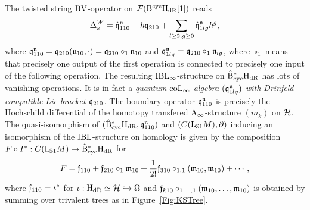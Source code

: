 \documentclass[\MainFolder/Text.tex]{subfiles}
\begin{document}
The twisted string $\mathrm{BV}$-operator on $\mathcal{F}(\mathrm{B}^{\mathrm{cyc}}\mathrm{H}_{\mathrm{dR}}[1])$ reads
\[ \operatorname{\Delta}^W_s = \hat{\mathfrak{q}}^{\mathfrak{n}}_{110}  +  \hbar{\mathfrak{q}}_{210} + \sum_{l\ge 2, g\ge 0} \hat{\mathfrak{q}}^{\mathfrak{n}}_{1lg} \hbar^{g}, \]
where $\mathfrak{q}_{110}^{\mathfrak{n}} = \mathfrak{q}_{210}(\mathfrak{n}_{10},\cdot) = \mathfrak{q}_{210} \circ_1 \mathfrak{n}_{10}$ and $\mathfrak{q}_{1lg}^{\mathfrak{n}} = \mathfrak{q}_{210}\circ_1 \mathfrak{n}_{lg}$, where $\circ_1$ means that precisely one output of the first operation is connected to precisely one input of the following operation.
The resulting $\mathrm{IBL}_\infty$-structure on $\hat{\mathrm{B}}_{\mathrm{cyc}}^*\mathrm{H}_{\mathrm{dR}}$ has lots of vanishing operations.
It is in fact a \emph{quantum $\mathrm{coL}_\infty$-algebra $(\mathfrak{q}_{1lg}^{\mathfrak{n}})$ with Drinfeld-compatible Lie bracket $\mathfrak{q}_{210}$.}
The boundary operator $\mathfrak{q}_{110}^{\mathfrak{n}}$ is precisely the Hochschild differential of the homotopy transfered $\mathrm{A}_\infty$-structure $(m_k)$ on $\mathcal{H}$.
The quasi-isomorphism of $(\hat{\mathrm{B}}_{\mathrm{cyc}}^*\mathrm{H}_{\mathrm{dR}},\mathfrak{q}_{110}^{\mathfrak{n}})$ and $(C(\mathrm{L}_{\mathbb{S}{1}} M),\partial)$ inducing an isomorphism of the $\mathrm{IBL}$-structure on homology is given by the composition $F\circ I^*: C(\mathrm{L}_{\mathbb{S}{1}} M) \rightarrow \hat{\mathrm{B}}_{\mathrm{cyc}}^* \mathrm{H}_{\mathrm{dR}}$ for
\[ F = \mathfrak{f}_{110} + \mathfrak{f}_{210}\circ_1 \mathfrak{m}_{10} + \frac{1}{2!} \mathfrak{f}_{310}\circ_{1,1}(\mathfrak{m}_{10},\mathfrak{m}_{10}) + \dotsb, \]
where $\mathfrak{f}_{110} = \iota^*$ for $\iota: \mathrm{H}_{\mathrm{dR}}\simeq \mathcal{H} \xhookrightarrow{} \Omega$ and $\mathfrak{f}_{k10}\circ_{1,\dotsc,1}(\mathfrak{m}_{10},\dotsc,\mathfrak{m}_{10})$ is obtained by summing over trivalent trees as in Figure~\ref{Fig:KSTree}.
\end{document}
